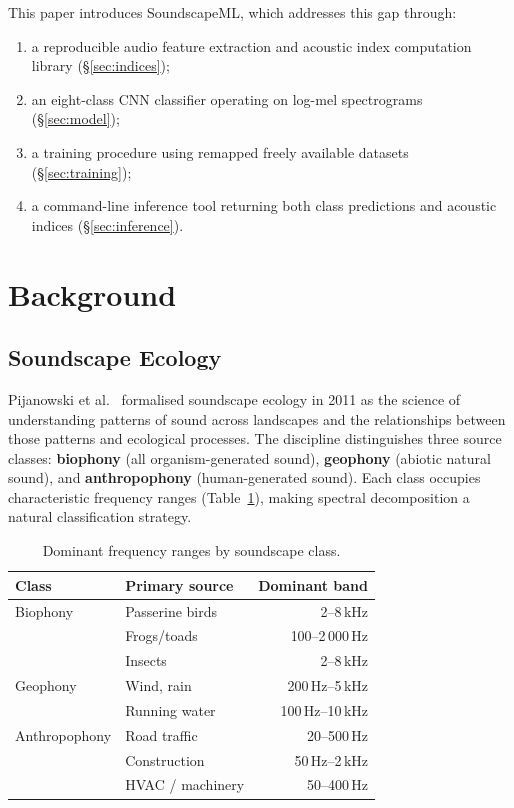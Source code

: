 \documentclass[10pt,twocolumn]{article}
\begin{document}
This paper introduces SoundscapeML, which addresses this gap through:
\begin{enumerate}[topsep=2pt, itemsep=1pt]
  \item a reproducible audio feature extraction and acoustic index computation
        library (\S\ref{sec:indices});
  \item an eight-class CNN classifier operating on log-mel spectrograms
        (\S\ref{sec:model});
  \item a training procedure using remapped freely available datasets
        (\S\ref{sec:training});
  \item a command-line inference tool returning both class predictions and
        acoustic indices (\S\ref{sec:inference}).
\end{enumerate}

\section{Background}

\subsection{Soundscape Ecology}

Pijanowski et al.\ \cite{pijanowski2011} formalised soundscape ecology in 2011
as the science of understanding patterns of sound across landscapes and the
relationships between those patterns and ecological processes. The discipline
distinguishes three source classes:
\textbf{biophony} (all organism-generated sound),
\textbf{geophony} (abiotic natural sound), and
\textbf{anthropophony} (human-generated sound).
Each class occupies characteristic frequency ranges (Table~\ref{tab:freqs}),
making spectral decomposition a natural classification strategy.

\begin{table}[h]
\centering
\caption{Dominant frequency ranges by soundscape class.}
\label{tab:freqs}
\small
\begin{tabular}{@{}llr@{}}
\toprule
Class & Primary source & Dominant band \\
\midrule
\textcolor{bio}{Biophony} & Passerine birds & 2–8\,kHz \\
 & Frogs/toads & 100–2\,000\,Hz \\
 & Insects & 2–8\,kHz \\
\textcolor{geo}{Geophony} & Wind, rain & 200\,Hz–5\,kHz \\
 & Running water & 100\,Hz–10\,kHz \\
\textcolor{anthro}{Anthropophony} & Road traffic & 20–500\,Hz \\
 & Construction & 50\,Hz–2\,kHz \\
 & HVAC / machinery & 50–400\,Hz \\
\bottomrule
\end{tabular}
\end{table}
\end{document}
